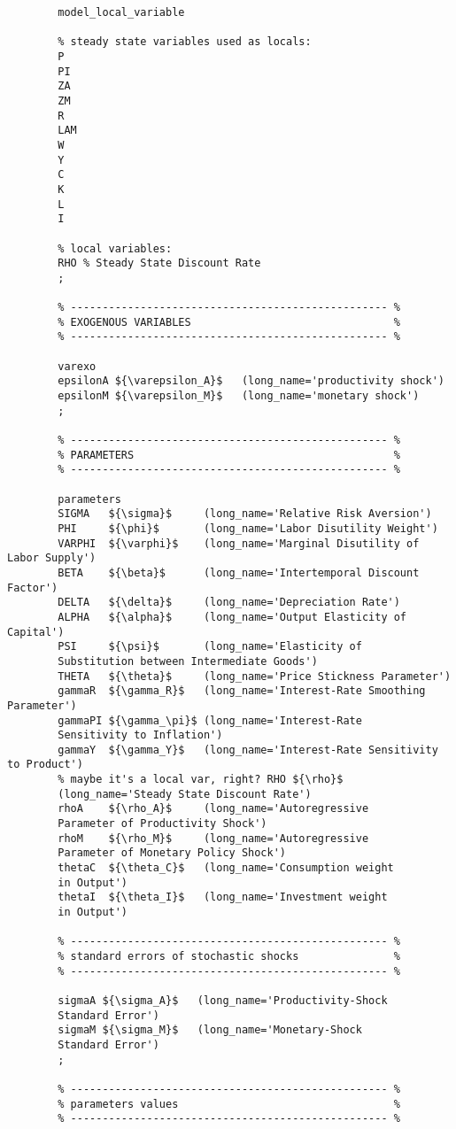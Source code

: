 \documentclass[
thesis.tex
]{subfiles}
\begin{document}
{\begin{verbatim}
		model_local_variable
		
		% steady state variables used as locals:
		P
		PI
		ZA
		ZM
		R
		LAM
		W
		Y
		C
		K
		L
		I
		
		% local variables:
		RHO % Steady State Discount Rate
		;
		
		% -------------------------------------------------- %
		% EXOGENOUS VARIABLES                                %
		% -------------------------------------------------- %
		
		varexo
		epsilonA ${\varepsilon_A}$   (long_name='productivity shock')
		epsilonM ${\varepsilon_M}$   (long_name='monetary shock')
		;
		
		% -------------------------------------------------- %
		% PARAMETERS                                         %
		% -------------------------------------------------- %
		
		parameters
		SIGMA   ${\sigma}$     (long_name='Relative Risk Aversion')
		PHI     ${\phi}$       (long_name='Labor Disutility Weight')  
		VARPHI  ${\varphi}$    (long_name='Marginal Disutility of Labor Supply')
		BETA    ${\beta}$      (long_name='Intertemporal Discount Factor')
		DELTA   ${\delta}$     (long_name='Depreciation Rate')
		ALPHA   ${\alpha}$     (long_name='Output Elasticity of Capital')
		PSI     ${\psi}$       (long_name='Elasticity of 
		Substitution between Intermediate Goods')
		THETA   ${\theta}$     (long_name='Price Stickness Parameter')
		gammaR  ${\gamma_R}$   (long_name='Interest-Rate Smoothing Parameter')
		gammaPI ${\gamma_\pi}$ (long_name='Interest-Rate 
		Sensitivity to Inflation')
		gammaY  ${\gamma_Y}$   (long_name='Interest-Rate Sensitivity to Product')
		% maybe it's a local var, right? RHO ${\rho}$ 
		(long_name='Steady State Discount Rate')
		rhoA    ${\rho_A}$     (long_name='Autoregressive 
		Parameter of Productivity Shock')
		rhoM    ${\rho_M}$     (long_name='Autoregressive 
		Parameter of Monetary Policy Shock')
		thetaC  ${\theta_C}$   (long_name='Consumption weight 
		in Output')
		thetaI  ${\theta_I}$   (long_name='Investment weight 
		in Output')
		
		% -------------------------------------------------- % 
		% standard errors of stochastic shocks               %
		% -------------------------------------------------- %
		
		sigmaA ${\sigma_A}$   (long_name='Productivity-Shock 
		Standard Error')
		sigmaM ${\sigma_M}$   (long_name='Monetary-Shock 
		Standard Error')
		;
		
		% -------------------------------------------------- %
		% parameters values                                  %
		% -------------------------------------------------- % 
		

\end{verbatim}}
\end{document}
